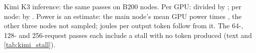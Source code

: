 \begin{table}[h]
  \caption{Kimi K3 inference: the same passes on \TriKimiFourNodes{} B200 nodes. Per GPU: divided by \TriKimiFourGpus; per node: by \TriKimiFourNodes. Power is an estimate: the main node's mean GPU power times \TriKimiFourNodes, the other three nodes not sampled; joules per output token follow from it. The 64-, 128- and 256-request passes each include a stall with no token produced (text and \cref{tab:kimi_stall}).}
  \label{tab:kimi_passes_four}
  \centering\scriptsize
  \begin{adjustbox}{max width=\linewidth}
  \end{adjustbox}
\end{table}

